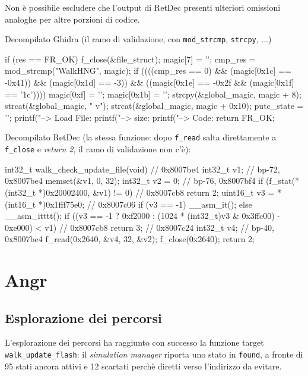             Non è possibile escludere che l'output di RetDec presenti ulteriori omissioni analoghe per altre porzioni di codice.

            Decompilato Ghidra (il ramo di validazione, con 
            \texttt{mod\_strcmp}, \texttt{strcpy}, ...)

            
\begin{clangcode}[fontsize=\footnotesize]
if (res == FR_OK) {
    f_close(&file_struct);
    magic[7] = '\0';
    cmp_res = mod_strcmp("WalkHNG", magic);
    if ((((cmp_res == 0) && (magic[0x1c] == -0x41)) && (magic[0x1d] == -3)) &&
        ((magic[0x1e] == -0x2f && (magic[0x1f] == '\x1c')))) {
        magic[0xf] = '\0';
        magic[0x1b] = '\0';
        strcpy(&global_magic, magic + 8);
        strcat(&global_magic, " v");
        strcat(&global_magic, magic + 0x10);
        putc_state = '\0';
        printf("--> Load File: %
        printf("--> size: %
        printf("--> Code: %
        return FR_OK;
    }
}
\end{clangcode}

Decompilato RetDec (la stessa funzione: dopo \texttt{f\_read} salta direttamente a \texttt{f\_close} e \textit{return 2}, il ramo di validazione non c'è):
\begin{clangcode}[fontsize=\footnotesize]
int32_t walk_check_update_file(void) {
    // 0x8007be4
    int32_t v1; // bp-72, 0x8007be4
    memset(&v1, 0, 32);
    int32_t v2 = 0; // bp-76, 0x8007bf4
    if (f_stat(*(int32_t *)0x20002400, &v1) != 0) {
        // 0x8007cb8
        return 2;
    }
    uint16_t v3 = *(int16_t *)0x1fff75e0; // 0x8007c06
    if (v3 == -1) {
        __asm_it();
    } else {
        __asm_itttt();
    }
    if ((v3 == -1 ? 0xf2000 : (1024 * (int32_t)v3 & 0x3ffc00) - 0xe000) < v1) {
        // 0x8007cb8
        return 3;
    }
    // 0x8007c24
    int32_t v4; // bp-40, 0x8007be4
    f_read(0x2640, &v4, 32, &v2);
    f_close(0x2640);
    return 2;
}
\end{clangcode}
        \section{Angr}
        \label{subsec:risultati_angr}
        \subsection{Esplorazione dei percorsi}
        \label{subsec:risultati_esplorazione_percorsi}
        L'esplorazione dei percorsi ha raggiunto con successo la funzione 
        target \texttt{walk\_update\_flash}: il \textit{simulation manager} 
        riporta uno stato in \texttt{found}, a fronte di 95 stati ancora attivi 
        e 12 scartati perchè diretti verso l'indirizzo da evitare.
        
